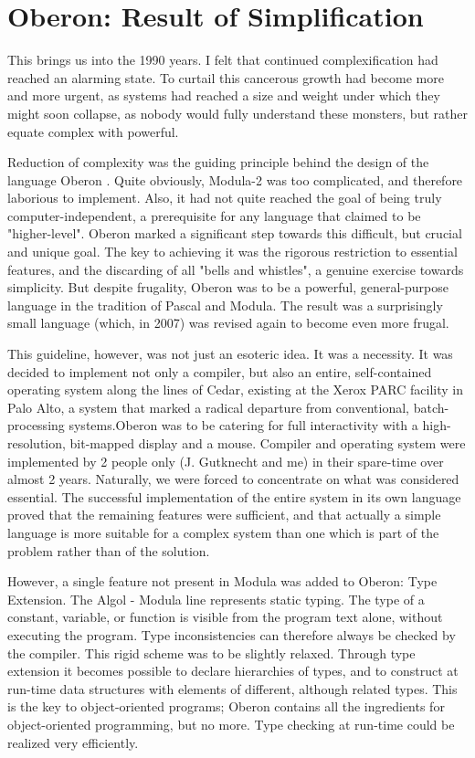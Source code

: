 \section{Oberon: Result of Simplification}
This brings us into the 1990 years. I felt that continued complexification had
reached an alarming state. To curtail this cancerous growth had become more and
more urgent, as systems had reached a size and weight under which they might
soon collapse, as nobody would fully understand these monsters, but rather
equate complex with powerful.

Reduction of complexity was the guiding principle behind the design of the
language Oberon . Quite obviously, Modula-2 was too complicated, and therefore
laborious to implement. Also, it had not quite reached the goal of being truly
computer-independent, a prerequisite for any language that claimed to be
"higher-level". Oberon marked a significant step towards this difficult, but crucial
and unique goal. The key to achieving it was the rigorous restriction to essential
features, and the discarding of all "bells and whistles", a genuine exercise towards
simplicity. But despite frugality, Oberon was to be a powerful, general-purpose
language in the tradition of Pascal and Modula. The result was a surprisingly small
language (which, in 2007) was revised again to become even more frugal.

This guideline, however, was not just an esoteric idea. It was a necessity. It was
decided to implement not only a compiler, but also an entire, self-contained
operating system along the lines of Cedar, existing at the Xerox PARC facility in
Palo Alto, a system that marked a radical departure from conventional,
batch-processing systems.Oberon was to be catering for full interactivity with a
high-resolution, bit-mapped display and a mouse. Compiler and operating system were
implemented by 2 people only (J. Gutknecht and me) in their spare-time over almost
2 years. Naturally, we were forced to concentrate on what was considered essential.
The successful implementation of the entire system in its own language proved that
the remaining features were sufficient, and that actually a simple language is more
suitable for a complex system than one which is part of the problem rather than of
the solution.

However, a single feature not present in Modula was added to Oberon: Type Extension.
The Algol - Modula line represents static typing. The type of a constant, variable,
or function is visible from the program text alone, without executing the program.
Type inconsistencies can therefore always be checked by the compiler. This rigid
scheme was to be slightly relaxed. Through type extension it becomes possible to
declare hierarchies of types, and to construct at run-time data structures with
elements of different, although related types. This is the key to object-oriented
programs; Oberon contains all the ingredients for object-oriented programming, but
no more. Type checking at run-time could be realized very efficiently.

